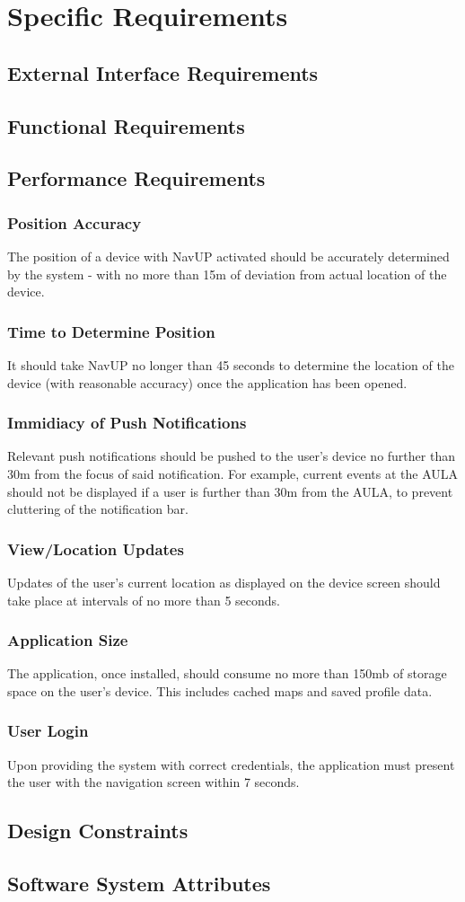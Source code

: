 \documentclass[12pt, a4paper]{article}
\begin{document}
\section{Specific Requirements}
	\subsection{External Interface Requirements}
	\subsection{Functional Requirements}
	\subsection{Performance Requirements}
		\subsubsection{Position Accuracy} The position of a device with NavUP activated should be accurately determined by the system - with no more than 15m of deviation from actual location of the device.
		\subsubsection{Time to Determine Position} It should take NavUP no longer than 45 seconds to determine the location of the device (with reasonable accuracy) once the application has been opened.
		\subsubsection{Immidiacy of Push Notifications} Relevant push notifications should be pushed to the user's device no further than 30m from the focus of said notification. For example, current events at the AULA should not be displayed if a user is further than 30m from the AULA, to prevent cluttering of the notification bar.
		\subsubsection{View/Location Updates} Updates of the user's current location as displayed on the device screen should take place at intervals of no more than 5 seconds.
		\subsubsection{Application Size} The application, once installed, should consume no more than 150mb of storage space on the user's device. This includes cached maps and saved profile data.
		\subsubsection{User Login} Upon providing the system with correct credentials, the application must present the user with the navigation screen within 7 seconds. 
	\subsection{Design Constraints}
	\subsection{Software System Attributes}
\end{document}
